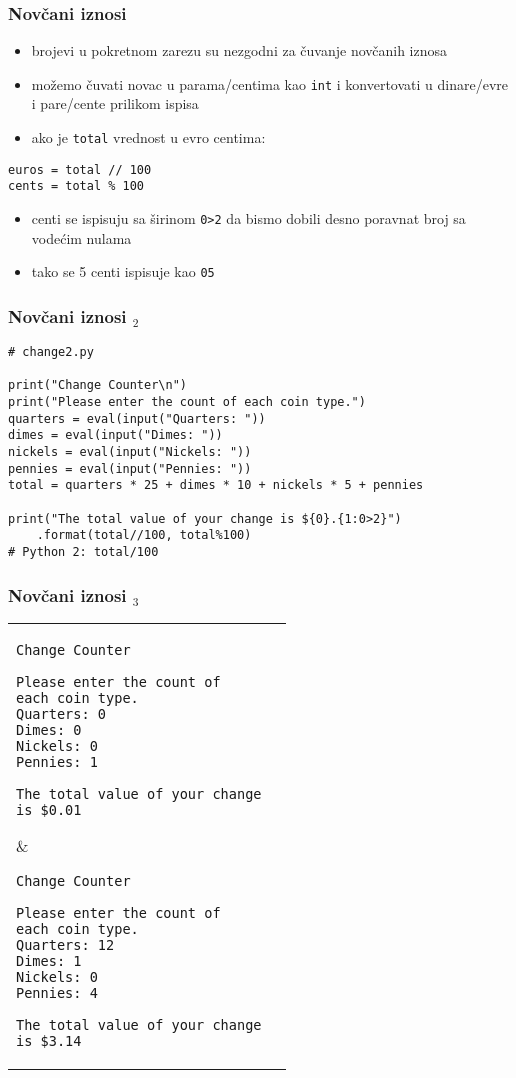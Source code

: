\documentclass[utf8,compress]{beamer}
\begin{document}
\begin{frame}[fragile]
  \frametitle{Novčani iznosi}
  \begin{itemize}
    \item brojevi u pokretnom zarezu su nezgodni za čuvanje novčanih iznosa
    \item možemo čuvati novac u parama/centima kao \texttt{int} i konvertovati u dinare/evre i pare/cente prilikom ispisa
    \item ako je \texttt{total} vrednost u evro centima:
  \end{itemize}
\begin{verbatim}
euros = total // 100
cents = total % 100
\end{verbatim}
  \begin{itemize}
    \item centi se ispisuju sa širinom \texttt{0>2} da bismo dobili desno poravnat broj sa vodećim nulama
    \item tako se 5 centi ispisuje kao \texttt{05}
  \end{itemize}
\end{frame}

\begin{frame}[fragile]
  \frametitle{Novčani iznosi $_2$}
\begin{verbatim}
# change2.py

print("Change Counter\n")
print("Please enter the count of each coin type.")
quarters = eval(input("Quarters: "))
dimes = eval(input("Dimes: "))
nickels = eval(input("Nickels: "))
pennies = eval(input("Pennies: "))
total = quarters * 25 + dimes * 10 + nickels * 5 + pennies 

print("The total value of your change is ${0}.{1:0>2}")
    .format(total//100, total%100)
# Python 2: total/100
\end{verbatim}
\end{frame}

\begin{frame}[fragile,shrink=20]
  \frametitle{Novčani iznosi $_3$}
\begin{center}
\begin{tabular}{p{6cm}|p{6cm}}
\begin{verbatim}
Change Counter

Please enter the count of
each coin type.
Quarters: 0
Dimes: 0
Nickels: 0
Pennies: 1

The total value of your change
is $0.01
\end{verbatim}
&
\begin{verbatim}
Change Counter

Please enter the count of
each coin type.
Quarters: 12
Dimes: 1
Nickels: 0
Pennies: 4

The total value of your change
is $3.14
\end{verbatim}
\end{tabular}
\end{center}
\end{frame}
\end{document}
